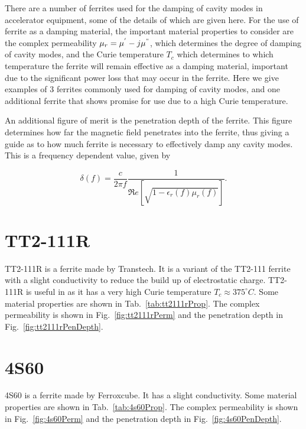 \label{app:ferrProp}

There are a number of ferrites used for the damping of cavity modes in accelerator equipment, some of the details of which are given here. For the use of ferrite as a damping material, the important material properties to consider are the complex permeability $\mu_{r} = \mu^{'} - j\mu^{"}$, which determines the degree of damping of cavity modes, and the Curie temperature $T_{c}$ which determines to which temperature the ferrite will remain effective as a damping material, important due to the significant power loss that may occur in the ferrite. Here we give examples of 3 ferrites commonly used for damping of cavity modes, and one additional ferrite that shows promise for use due to a high Curie temperature.

An additional figure of merit is the penetration depth of the ferrite. This figure determines how far the magnetic field penetrates into the ferrite, thus giving a guide as to how much ferrite is necessary to effectively damp any cavity modes. This is a frequency dependent value, given by

\begin{equation}
\delta\left( f \right) = \frac{c}{2\pi f}\frac{1}{\Re{}e\left[\sqrt{1-\epsilon_{r}\left( f \right) \mu_{r}\left( f \right)}\right]}.
\end{equation}

\section{TT2-111R}

TT2-111R is a ferrite made by Transtech. It is a variant of the TT2-111 ferrite with a slight conductivity to reduce the build up of electrostatic charge. TT2-111R is useful in as it has a very high Curie temperature $T_{c}\approx 375^{\circ}C$. Some material properties are shown in Tab.~\ref{tab:tt2111rProp}. The complex permeability is shown in Fig.~\ref{fig:tt2111rPerm} and the penetration depth in Fig.~\ref{fig:tt2111rPenDepth}.

\section{4S60}

4S60 is a ferrite made by Ferroxcube. It has a slight conductivity. Some material properties are shown in Tab.~\ref{tab:4s60Prop}. The complex permeability is shown in Fig.~\ref{fig:4s60Perm} and the penetration depth in Fig.~\ref{fig:4s60PenDepth}.

